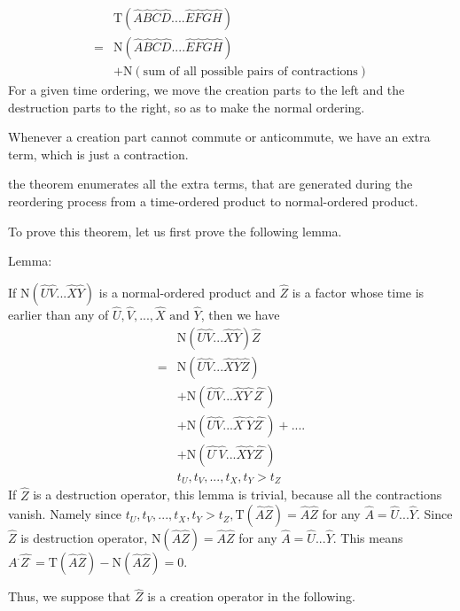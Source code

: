 \begin{align}
&\mathrm{T}(\hat{A}\hat{B}\hat{C}\hat{D}....\hat{E}\hat{F}\hat{G}\hat{H}) \nonumber \\
=&\mathrm{N}(\hat{A}\hat{B}\hat{C}\hat{D}....\hat{E}\hat{F}\hat{G}\hat{H}) \nonumber \\
&+\mathrm{N}(\text{sum of all possible pairs of contractions}) \nonumber 
\end{align}
For a given time ordering, we move the creation parts to the left and the destruction parts to the right, so as to make the normal ordering.

Whenever a creation part cannot commute or anticommute, we have an extra term, which is just a contraction.

the theorem enumerates all the extra terms, that are generated during the reordering process from a time-ordered product to normal-ordered product.

To prove this theorem, let us first prove the following lemma.

Lemma:

If $\mathrm{N}(\hat{U}\hat{V}...\hat{X}\hat{Y})$ is a normal-ordered product and $\hat{Z}$ is a factor whose time is earlier than any of $\hat{U},\hat{V},...,\hat{X} \text{ and } \hat{Y}$, then we have
\begin{align}
&\mathrm{N}(\hat{U}\hat{V}...\hat{X}\hat{Y})\hat{Z} \nonumber \\
=&\mathrm{N}(\hat{U}\hat{V}...\hat{X}\hat{Y}\hat{Z})\nonumber \\
&+\mathrm{N}(\hat{U}\hat{V}...\hat{X}\hat{Y^{\cdot}}\hat{Z^{\cdot}})\nonumber \\
&+\mathrm{N}(\hat{U}\hat{V}...\hat{X^{\cdot}}\hat{Y}\hat{Z^{\cdot}})+....\nonumber \\
&+\mathrm{N}(\hat{U^{\cdot}}\hat{V}...\hat{X}\hat{Y}\hat{Z^{\cdot}})\nonumber \\
& t_U,t_V,...,t_X,t_Y>t_Z \nonumber
\end{align}
If $\hat{Z}$ is a destruction operator, this lemma is trivial, because all the contractions vanish. Namely since $t_U,t_V,...,t_X,t_Y>t_Z,\mathrm{T}(\hat{A}\hat{Z})=\hat{A}\hat{Z}$ for any $\hat{A}=\hat{U}...\hat{Y}$. Since $\hat{Z}$ is destruction operator, $\mathrm{N}(\hat{A}\hat{Z})=\hat{A}\hat{Z}$ for any $\hat{A}=\hat{U}...\hat{Y}$. This means $\hat{A^{\cdot}}\hat{Z^{\cdot}}=\mathrm{T}(\hat{A}\hat{Z})-\mathrm{N}(\hat{A}\hat{Z})=0$.

Thus, we suppose that $\hat{Z}$ is a creation operator in the following.

